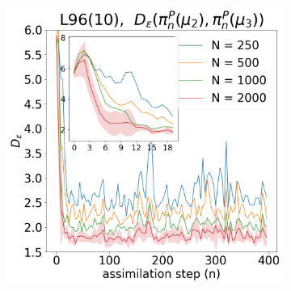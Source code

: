 \begin{figure}[!t]
\begin{subfigure}{0.3\textwidth}
\end{subfigure}\hspace{0mm}%
\begin{subfigure}{0.3\textwidth}
\includegraphics[width=\columnwidth]{stability/plots/figures-BPF-L96_10-1-dist_2_vs_3.png}
\end{subfigure}\hspace{0mm}%


\end{figure}
